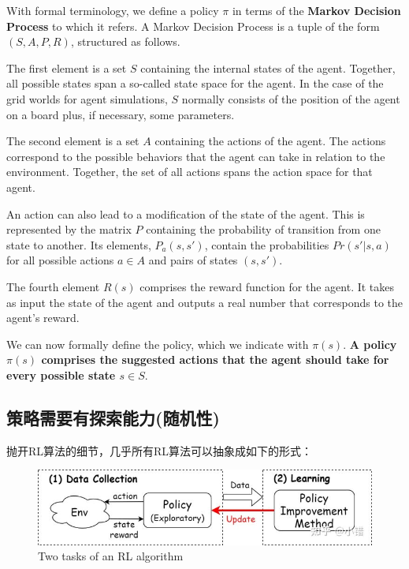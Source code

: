 With formal terminology, we define a policy $\pi$ in terms 
of the {\bf Markov Decision Process} to which it refers. 
A Markov Decision Process is a tuple of the form 
$(S, A, P, R)$, structured as follows.

The first element is a set $S$ containing the internal 
states of the agent. Together, all possible states span a 
so-called state space for the agent. In the case of the grid 
worlds for agent simulations, $S$ normally consists of the 
position of the agent on a board plus, if necessary, some 
parameters.

The second element is a set $A$ containing the actions of 
the agent. The actions correspond to the possible behaviors 
that the agent can take in relation to the environment. 
Together, the set of all actions spans the action space for 
that agent.

An action can also lead to a modification of the state of 
the agent. This is represented by the matrix $P$ containing 
the probability of transition from one state to another. 
Its elements, $P_a(s,s')$, contain the probabilities 
$Pr(s' | s, a)$ for all possible actions $a\in A$ and pairs 
of states $(s, s')$.

The fourth element $R(s)$ comprises the reward function for 
the agent. It takes as input the state of the agent and 
outputs a real number that corresponds to the agent's reward.

We can now formally define the policy, which we indicate with 
$\pi(s)$. {\bf A policy $\pi(s)$ comprises the suggested 
actions that the agent should take for every possible 
state $s\in S$}.

\subsection{策略需要有探索能力(随机性)}

抛开RL算法的细节，几乎所有RL算法可以抽象成如下的形式：
\begin{figure}[H]
\centering
\includegraphics[scale=0.5]{pix/exploration.jpg}
\caption{Two tasks of an RL algorithm}
\end{figure}

